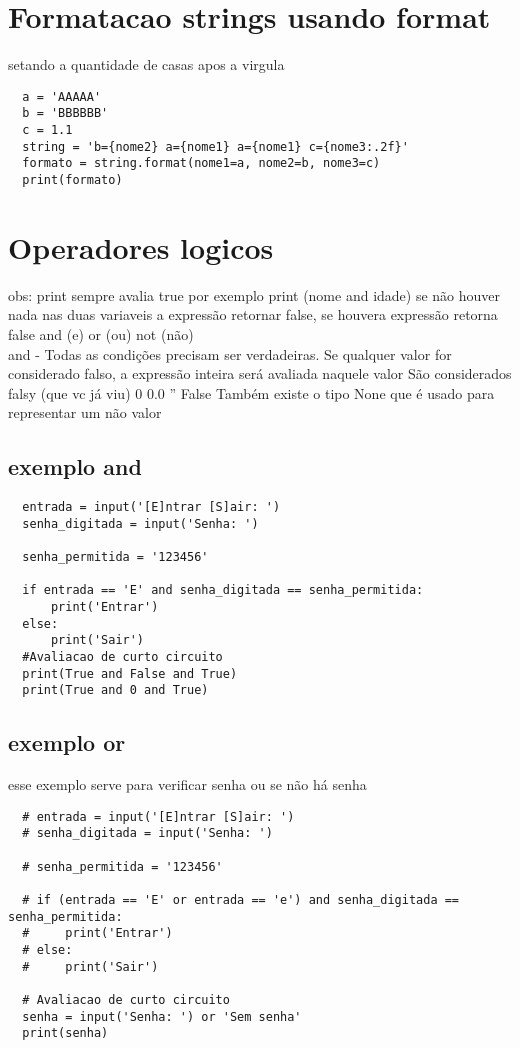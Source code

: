 \documentclass{article}
\begin{document}
\section{Formatacao strings usando format}  
setando a quantidade de casas apos a virgula
\begin{lstlisting}
  a = 'AAAAA'
  b = 'BBBBBB'
  c = 1.1
  string = 'b={nome2} a={nome1} a={nome1} c={nome3:.2f}'
  formato = string.format(nome1=a, nome2=b, nome3=c)
  print(formato)

\end{lstlisting}
\section{Operadores logicos}
obs: print sempre avalia true por exemplo print (nome and idade) se não houver nada nas duas variaveis 
a expressão retornar false, se houvera expressão retorna false
and (e) or (ou) not (não)\\
 and - Todas as condições precisam ser
 verdadeiras.
 Se qualquer valor for considerado falso,
 a expressão inteira será avaliada naquele valor
 São considerados falsy (que vc já viu)
 0 0.0 '' False
 Também existe o tipo None que é
 usado para representar um não valor\\
  \subsection{exemplo and}
  \begin{lstlisting}
  entrada = input('[E]ntrar [S]air: ')
  senha_digitada = input('Senha: ')

  senha_permitida = '123456'

  if entrada == 'E' and senha_digitada == senha_permitida:
      print('Entrar')
  else:
      print('Sair')
  #Avaliacao de curto circuito
  print(True and False and True)
  print(True and 0 and True)
  \end{lstlisting}
  \subsection{exemplo or}
  esse exemplo serve para verificar senha ou se não há senha
  \begin{lstlisting}
  # entrada = input('[E]ntrar [S]air: ')
  # senha_digitada = input('Senha: ')

  # senha_permitida = '123456'

  # if (entrada == 'E' or entrada == 'e') and senha_digitada == senha_permitida:
  #     print('Entrar')
  # else:
  #     print('Sair')

  # Avaliacao de curto circuito
  senha = input('Senha: ') or 'Sem senha'
  print(senha)
  \end{lstlisting} 
\end{document}
